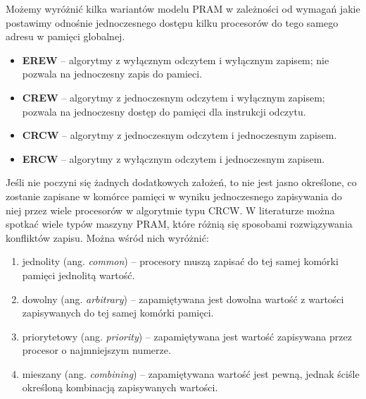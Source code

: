 

Możemy wyróżnić kilka wariantów modelu PRAM w zależności od wymagań jakie postawimy odnośnie jednoczesnego dostępu kilku procesorów do tego samego adresu w pamięci globalnej.\\
\begin{itemize}
\item\textbf{EREW} -- algorytmy z wyłącznym odczytem i wyłącznym zapisem; nie pozwala na jednoczesny zapis do pamieci.
\item\textbf{CREW} -- algorytmy z jednoczesnym odczytem i wyłącznym zapisem; pozwala na jednoczesny  dostęp do pamięci dla instrukcji odczytu.
\item\textbf{CRCW} -- algorytmy z jednoczesnym odczytem i jednoczesnym zapisem.
\item\textbf{ERCW} -- algorytmy z wyłącznym odczytem i jednoczesnym zapisem.
\end{itemize}


Jeśli nie poczyni się żadnych dodatkowych założeń, to nie jest jasno określone, co zostanie zapisane w komórce pamięci w wyniku jednoczesnego zapisywania do niej przez wiele procesorów w algorytmie typu CRCW. W literaturze można spotkać wiele typów maszyny PRAM, które różnią się sposobami rozwiązywania konfliktów zapisu. Można wśród nich wyróżnić\cite{Cormen94}:
\begin{enumerate}
\item jednolity (ang. \emph{common}) – procesory muszą zapisać do tej samej komórki pamięci jednolitą wartość.
\item dowolny (ang. \emph{arbitrary}) – zapamiętywana jest dowolna wartość z wartości zapisywanych do tej samej komórki pamięci.
\item priorytetowy (ang. \emph{priority}) – zapamiętywana jest wartość zapisywana przez procesor o najmniejszym numerze.
\item mieszany (ang. \emph{combining}) – zapamiętywana wartość jest pewną, jednak ściśle określoną kombinacją zapisywanych wartości.
\end{enumerate}

